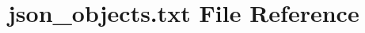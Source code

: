 \hypertarget{json__objects_8txt}{}\section{json\+\_\+objects.\+txt File Reference}
\label{json__objects_8txt}
